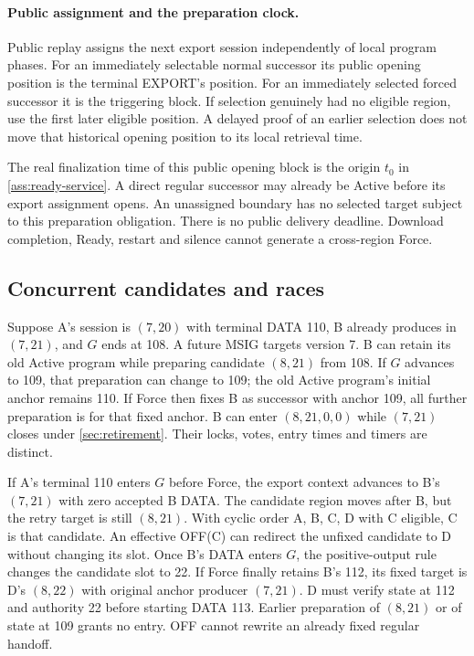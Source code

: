 \documentclass[11pt,a4paper]{article}
\begin{document}
\paragraph{Public assignment and the preparation clock.}
Public replay assigns the next export session independently of local
program phases. For an immediately selectable normal successor its
public opening position is the terminal EXPORT's position. For an
immediately selected forced successor it is the triggering block.
If selection genuinely had no eligible region, use the first later
eligible position. A delayed proof of an earlier selection does not
move that historical opening position to its local retrieval time.

The real finalization time of this public opening block is the origin
$t_0$ in \cref{ass:ready-service}. A direct regular successor may already
be Active before its export assignment opens. An unassigned boundary
has no selected target subject to this preparation obligation.
There is no public delivery deadline. Download completion, Ready,
restart and silence cannot generate a cross-region Force.

\subsection{Concurrent candidates and races}
\label{sec:runtime-races}
Suppose A's session is $(7,20)$ with terminal DATA 110, B already
produces in $(7,21)$, and $G$ ends at 108. A future MSIG targets
version 7. B can retain its old Active program while preparing
candidate $(8,21)$ from 108. If $G$ advances to 109, that preparation
can change to 109; the old Active program's initial anchor remains
110. If Force then fixes B as successor with anchor 109, all further
preparation is for that fixed anchor. B can enter $(8,21,0,0)$ while
$(7,21)$ closes under \cref{sec:retirement}. Their locks, votes,
entry times and timers are distinct.

If A's terminal 110 enters $G$ before Force, the export context
advances to B's $(7,21)$ with zero accepted B DATA. The candidate region
moves after B, but the retry target is still $(8,21)$. With cyclic order
A, B, C, D with C eligible, C is that candidate. An effective
OFF(C) can redirect the unfixed candidate to D without changing its slot.
Once B's DATA enters $G$, the positive-output rule changes the candidate
slot to 22. If Force finally retains B's 112, its fixed target is D's
$(8,22)$ with original anchor producer $(7,21)$. D must verify state at
112 and authority 22 before starting DATA 113.
Earlier preparation of $(8,21)$ or of state at 109 grants no entry.
OFF cannot rewrite an already fixed regular handoff.
\end{document}
